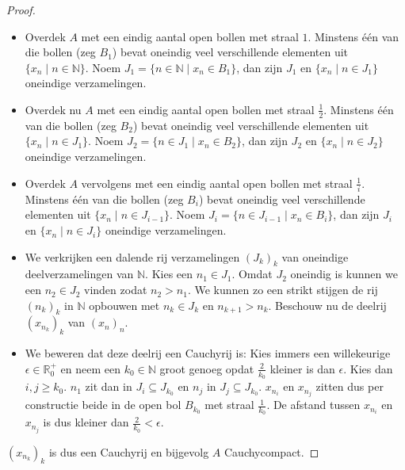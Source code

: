 \documentclass[main.tex]{subfiles}
\begin{document}
\begin{st}
\begin{proof}
      \begin{itemize}
      \item 
        Overdek $A$ met een eindig aantal open bollen met straal $1$.
        Minstens \'e\'en van die bollen (zeg $B_{1}$) bevat oneindig veel verschillende elementen uit $\{x_{n}\mid n\in \mathbb{N}\}$.
        Noem $J_{1}= \{n\in \mathbb{N} \mid x_{n}\in B_{1}\}$, dan zijn $J_{1}$ en $\{x_{n}\mid n\in J_{1}\}$ oneindige verzamelingen.
      \item 
        Overdek nu $A$ met een eindig aantal open bollen met straal $\frac{1}{2}$.
        Minstens \'e\'en van die bollen (zeg $B_{2}$) bevat oneindig veel verschillende elementen uit $\{x_{n}\mid n\in J_{1}\}$.
        Noem $J_{2}= \{n\in J_{1} \mid x_{n}\in B_{2}\}$, dan zijn $J_{2}$ en $\{x_{n}\mid n\in J_{2}\}$ oneindige verzamelingen.
      \item 
        Overdek $A$ vervolgens met een eindig aantal open bollen met straal $\frac{1}{i}$.
        Minstens \'e\'en van die bollen (zeg $B_{i}$) bevat oneindig veel verschillende elementen uit $\{x_{n}\mid n\in J_{i-1}\}$.
        Noem $J_{i}= \{n\in J_{i-1} \mid x_{n}\in B_{i}\}$, dan zijn $J_{i}$ en $\{x_{n}\mid n\in J_{i}\}$ oneindige verzamelingen.
      \item 
        We verkrijken een dalende rij verzamelingen $(J_{k})_{k}$ van oneindige deelverzamelingen van $\mathbb{N}$. Kies een $n_{1}\in J_{1}$. Omdat $J_{2}$ oneindig is kunnen we een $n_{2}\in J_{2}$ vinden zodat $n_{2} > n_{1}$. We kunnen zo een strikt stijgen de rij $(n_{k})_{k}$ in $\mathbb{N}$ opbouwen met $n_{k}\in J_{k}$ en $n_{k+1} > n_{k}$.
        Beschouw nu de deelrij $(x_{n_{k}})_{k}$ van $(x_{n})_{n}$.
      \item 
        We beweren dat deze deelrij een Cauchyrij is:
        Kies immers een willekeurige $\epsilon \in \mathbb{R}_{0}^{+}$ en neem een $k_{0}\in \mathbb{N}$ groot genoeg opdat $\frac{2}{k_{0}}$ kleiner is dan $\epsilon$.
        Kies dan $i,j \ge k_{0}$. $n_{1}$ zit dan in $J_{i} \subseteq J_{k_{0}}$ en $n_{j}$ in $J_{j} \subseteq J_{k_{0}}$.
        $x_{n_{i}}$ en $x_{n_{j}}$ zitten dus per constructie beide in de open bol $B_{k_{0}}$ met straal $\frac{1}{k_{0}}$.
        De afstand tussen $x_{n_{i}}$ en $x_{n_{j}}$ is dus kleiner dan $\frac{2}{k_{0}} < \epsilon$.
      \end{itemize}
      $(x_{n_{k}})_{k}$ is dus een Cauchyrij en bijgevolg $A$ Cauchycompact.
    \end{proof}
  \end{st}
\end{document}
